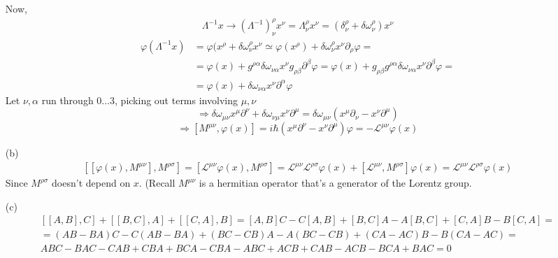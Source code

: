 \documentclass[twoside]{amsart}
\begin{document}
\begin{itemize}
Now, 
\[
\begin{gathered}
  \Lambda^{-1} x \to (\Lambda^{-1} )^{\rho}_{\nu} x^{\nu} = \Lambda_{\nu}^{\rho}x^{\nu} = (\delta_{\nu}^{\rho} + \delta \omega_{\nu}^{\rho} ) x^{\nu} 
\end{gathered}
\]
\[
\begin{aligned}
  \varphi(\Lambda^{-1}x ) & = \varphi(x^{\rho} + \delta \omega_{\nu}^{\rho} x^{\nu} \simeq \varphi(x^{\rho} ) + \delta \omega_{\nu}^{\rho} x^{ \nu} \partial_{\rho} \varphi = \\
  & = \varphi(x) + g^{\rho \alpha} \delta \omega_{\nu \alpha} x^{\nu} g_{\rho \beta} \partial^{\beta} \varphi = \varphi(x) + g_{\rho \beta} g^{\rho \alpha} \delta \omega_{\nu \alpha}x^{\nu} \partial^{\beta} \varphi = \\
  & = \varphi(x) + \delta \omega_{\nu \alpha} x^{\nu } \partial^{\alpha} \varphi
\end{aligned}
\]
Let $\nu, \alpha$ run through $0\dots 3$, picking out terms involving $\mu, \nu$
\[
\Longrightarrow \delta \omega_{\mu \nu} x^{\mu} \partial^{\nu} + \delta \omega_{\nu \mu} x^{\nu} \partial^{\mu} = \delta \omega_{\mu \nu} (x^{\mu}\partial_{\nu} - x^{\nu} \partial^{\mu} ) 
\]
\[
\Longrightarrow \boxed{ \left[ M^{\mu \nu}, \varphi(x) \right] = i \hbar (x^{\mu} \partial^{\nu} - x^{\nu} \partial^{\mu} ) \varphi = - \mathcal{L}^{\mu \nu} \varphi(x) }
\]
\item[(b)] \[
\begin{gathered}
  \left[ \left[ \varphi(x), M^{\mu \nu} \right], M^{\rho \sigma} \right] = \left[ \mathcal{L}^{\mu \nu} \varphi(x), M^{\rho \sigma} \right] = \mathcal{L}^{\mu \nu } \mathcal{L}^{\rho \sigma} \varphi(x) + \left[ \mathcal{L}^{\mu \nu }, M^{\rho \sigma} \right] \varphi(x) = \mathcal{L}^{\mu \nu} \mathcal{L}^{\rho \sigma} \varphi(x)
\end{gathered}
\] 
Since $M^{\rho \sigma}$ doesn't depend on $x$.  (Recall $M^{\mu \nu}$ is a hermitian operator that's a generator of the Lorentz group.  
\item[(c)] \[
\begin{gathered}
  \left[ \left[ A, B \right], C \right] + \left[ \left[ B, C \right] , A \right] + \left[ \left[ C,A \right], B \right] = \left[ A, B \right] C - C [A,B] + [B,C] A - A [B,C] + [C,A] B- B[C,A ] = \\ 
  = (AB-BA) C - C(AB- BA) + (BC - CB) A - A(BC - CB ) + (CA - AC) B - B(CA - AC) = \\
ABC - BAC - CAB + CBA + BCA - CBA - ABC + ACB + CAB - ACB - BCA + BAC = 0 
\end{gathered}
\]
\end{itemize}
\end{document}
